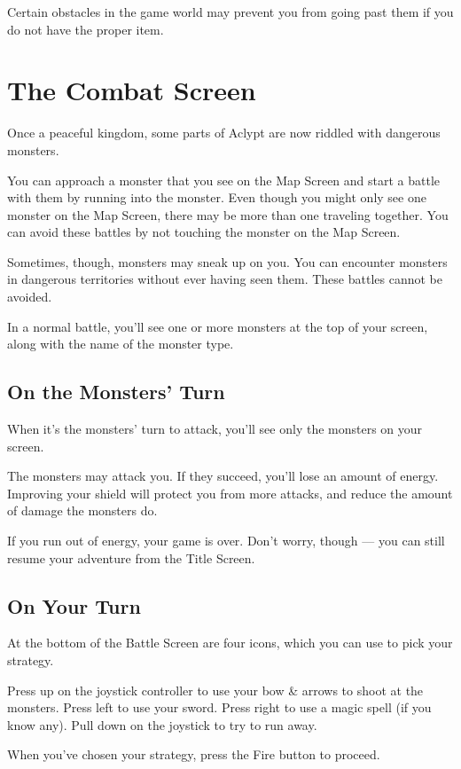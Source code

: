 \documentclass[10pt,twoside,openright]{memoir}
\begin{document}
Certain obstacles in the game world may prevent you from going past
them if you do not have the proper item.


\section{The Combat Screen}

Once a peaceful kingdom, some parts of Aclypt are now riddled with
dangerous monsters.

You can approach a monster that you see on the Map Screen and start a
battle with them by running into the monster. Even though you might
only see one monster on the Map Screen, there may be more than one
traveling together. You can avoid these battles by not touching the
monster on the Map Screen.

Sometimes, though, monsters may sneak up on you. You can encounter
monsters in dangerous territories without ever having seen them. These
battles cannot be avoided.

In a normal battle, you'll see one or more monsters at the top of your
screen, along with the name of the monster type.

\subsection{On the Monsters' Turn}

When it's the monsters' turn to attack, you'll see only the monsters
on your screen.

The monsters may attack you. If they succeed, you'll lose an amount of
energy. Improving your shield will protect you from more attacks, and
reduce the amount of damage the monsters do.

If you run out of energy, your game is over. Don't worry, though ---
you can still resume your adventure from the Title Screen.

\subsection{On Your Turn}

At the bottom of the Battle Screen are four icons, which you can use
to pick your strategy.

Press up on the joystick controller to use your bow \& arrows to shoot
at the monsters. Press left to use your sword. Press right to use a
magic spell (if you know any). Pull down on the joystick to try to run
away.

When you've chosen your strategy, press the Fire button to proceed.
\end{document}
